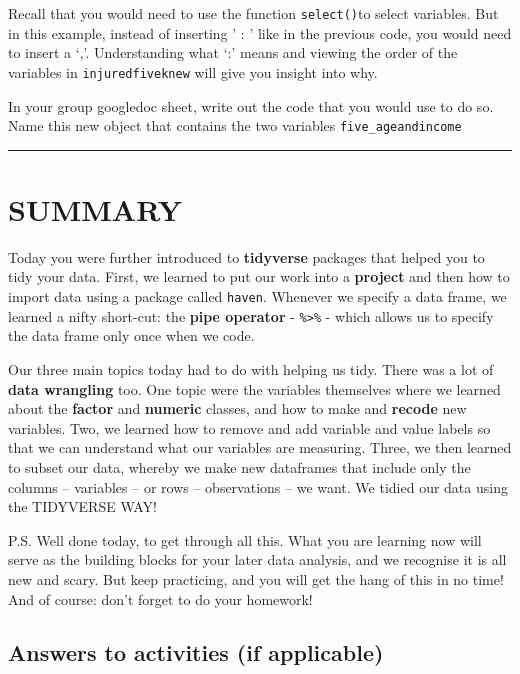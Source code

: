 \documentclass[
]{book}
\begin{document}
Recall that you would need to use the function \texttt{select()}to select variables. But in this example, instead of inserting ' : ' like in the previous code, you would need to insert a `,'. Understanding what `:' means and viewing the order of the variables in \texttt{injuredfiveknew} will give you insight into why.

In your group googledoc sheet, write out the code that you would use to do so. Name this new object that contains the two variables \texttt{five\_ageandincome}

\begin{center}\rule{0.5\linewidth}{0.5pt}\end{center}

\hypertarget{summary-1}{%
\section{SUMMARY}\label{summary-1}}

Today you were further introduced to \textbf{tidyverse} packages that helped you to tidy your data. First, we learned to put our work into a \textbf{project} and then how to import data using a package called \texttt{haven}. Whenever we specify a data frame, we learned a nifty short-cut: the \textbf{pipe operator} - \texttt{\%\textgreater{}\%} - which allows us to specify the data frame only once when we code.

Our three main topics today had to do with helping us tidy. There was a lot of \textbf{data wrangling} too. One topic were the variables themselves where we learned about the \textbf{factor} and \textbf{numeric} classes, and how to make and \textbf{recode} new variables. Two, we learned how to remove and add variable and value labels so that we can understand what our variables are measuring. Three, we then learned to subset our data, whereby we make new dataframes that include only the columns -- variables -- or rows -- observations -- we want. We tidied our data using the TIDYVERSE WAY!

P.S. Well done today, to get through all this. What you are learning now will serve as the building blocks for your later data analysis, and we recognise it is all new and scary. But keep practicing, and you will get the hang of this in no time! And of course: don't forget to do your homework!

\hypertarget{answers-to-activities-if-applicable}{%
\subsection{Answers to activities (if applicable)}\label{answers-to-activities-if-applicable}}
\end{document}
